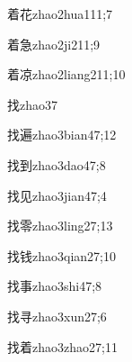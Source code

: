 \begin{verbete}{着花}{zhao2hua1}{11;7}
\end{verbete}

\begin{verbete}{着急}{zhao2ji2}{11;9}
\end{verbete}

\begin{verbete}{着凉}{zhao2liang2}{11;10}
\end{verbete}

\begin{verbete}{找}{zhao3}{7}
\end{verbete}

\begin{verbete}{找遍}{zhao3bian4}{7;12}
\end{verbete}

\begin{verbete}{找到}{zhao3dao4}{7;8}
\end{verbete}

\begin{verbete}{找见}{zhao3jian4}{7;4}
\end{verbete}

\begin{verbete}{找零}{zhao3ling2}{7;13}
\end{verbete}

\begin{verbete}{找钱}{zhao3qian2}{7;10}
\end{verbete}

\begin{verbete}{找事}{zhao3shi4}{7;8}
\end{verbete}

\begin{verbete}{找寻}{zhao3xun2}{7;6}
\end{verbete}

\begin{verbete}{找着}{zhao3zhao2}{7;11}
\end{verbete}

